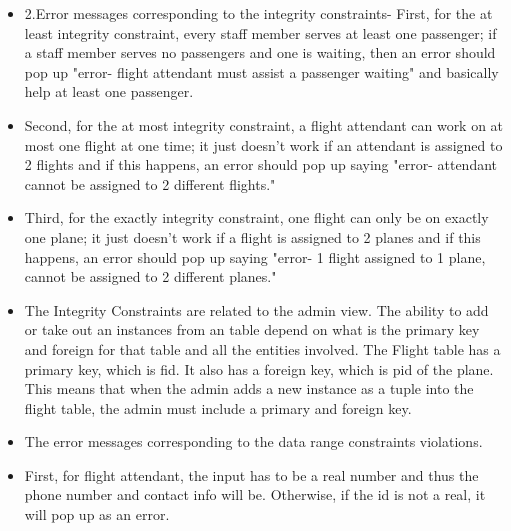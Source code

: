 \documentclass[10pt,conference]{IEEEtran}
\begin{document}
\begin{itemize} \item{2.Error messages corresponding to the integrity constraints- First, for the at least integrity constraint, every staff member serves at least one passenger; if a staff member serves no passengers and one is waiting, then an error should pop up "error- flight attendant must assist a passenger waiting" and basically help at least one passenger.} \end{itemize}

\begin{itemize} \item{Second, for the at most integrity constraint, a flight attendant can work on at most one flight at one time; it just doesn't work if an attendant is assigned to 2 flights and if this happens, an error should pop up saying "error- attendant cannot be assigned to 2 different flights."} \end{itemize}


\begin{itemize} \item{Third, for the exactly integrity constraint, one flight can only be on exactly one plane; it just doesn't work if a flight is assigned to 2 planes and if this happens, an error should pop up saying "error- 1 flight assigned to 1 plane, cannot be assigned to 2 different planes."} \end{itemize}

\begin{itemize} \item{The Integrity Constraints are related to the admin view. The ability to add or take out an instances from an table depend on what is the primary key and foreign for that table and all the entities involved. The Flight table has a primary key, which is fid. It also has a foreign key, which is pid of the plane. This means that when the admin adds a new instance as a tuple into the flight table, the admin must include a primary and foreign key.
} \end{itemize}


\begin{itemize} \item{The error messages corresponding to the data range constraints violations.} \end{itemize}

\begin{itemize} \item{First, for flight attendant, the input has to be a real number and thus the phone number and contact info will be. Otherwise, if the id is not a real, it will pop up as an error.} \end{itemize}
\end{document}
